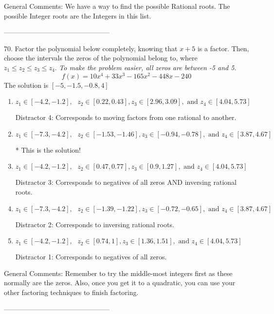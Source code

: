 \documentclass{extbook}[14pt]
\begin{document}
General Comments: We have a way to find the possible Rational roots. The possible Integer roots are the Integers in this list.

-----------------------------------------------

70. Factor the polynomial below completely, knowing that $x+5$ is a factor. Then, choose the intervals the zeros of the polynomial belong to, where $z_1 \leq z_2 \leq z_3 \leq z_4$. \textit{To make the problem easier, all zeros are between -5 and 5.}
\[ f(x) = 10x^{4} +33 x^{3} -165 x^{2} -448 x -240 \] 
The solution is $ [-5, -1.5, -0.8, 4] $ 

\begin{enumerate}[label=\Alph*.] 
\item $ z_1 \in [-4.2, -1.2], \text{   }  z_2 \in [0.22, 0.43], z_3 \in [2.96, 3.09], \text{   and   } z_4 \in [4.04, 5.73] $ 

  Distractor 4: Corresponds to moving factors from one rational to another. 
\item $ z_1 \in [-7.3, -4.2], \text{   }  z_2 \in [-1.53, -1.46], z_3 \in [-0.94, -0.78], \text{   and   } z_4 \in [3.87, 4.67] $ 

 * This is the solution! 
\item $ z_1 \in [-4.2, -1.2], \text{   }  z_2 \in [0.47, 0.77], z_3 \in [0.9, 1.27], \text{   and   } z_4 \in [4.04, 5.73] $ 

  Distractor 3: Corresponds to negatives of all zeros AND inversing rational roots. 
\item $ z_1 \in [-7.3, -4.2], \text{   }  z_2 \in [-1.39, -1.22], z_3 \in [-0.72, -0.65], \text{   and   } z_4 \in [3.87, 4.67] $ 

  Distractor 2: Corresponds to inversing rational roots. 
\item $ z_1 \in [-4.2, -1.2], \text{   }  z_2 \in [0.74, 1], z_3 \in [1.36, 1.51], \text{   and   } z_4 \in [4.04, 5.73] $ 

  Distractor 1: Corresponds to negatives of all zeros. 
\end{enumerate} 
 
General Comments: Remember to try the middle-most integers first as these normally are the zeros. Also, once you get it to a quadratic, you can use your other factoring techniques to finish factoring.

-----------------------------------------------
\end{document}
